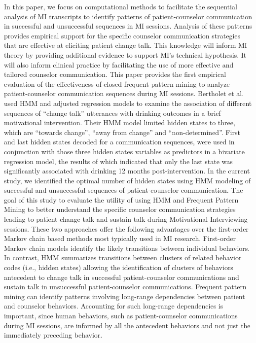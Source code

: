 In this paper, we focus on computational methods to facilitate the sequential analysis of MI transcripts to identify patterns of patient-counselor communication in successful and unsuccessful sequences in MI sessions. Analysis of these patterns provides empirical support for the specific counselor communication strategies that are effective at eliciting patient change talk. This knowledge will inform MI theory by providing additional evidence to support MI's technical hypothesis. It will also inform clinical practice by facilitating the use of more effective and tailored counselor communication. This paper provides the first empirical evaluation of the effectiveness of closed frequent pattern mining to analyze patient-counselor communication sequences during MI sessions. Bertholet et al.~\cite{bertholet2010change} used HMM and adjusted regression models to examine the association of different sequences of ``change talk'' utterances with drinking outcomes in a brief motivational intervention. Their HMM model limited hidden states to three, which are ``towards change'', ``away from change'' and ``non-determined''. First and last hidden states decoded for a communication sequences, were used in conjunction with those three hidden states variables as predictors in a bivariate regression model, the results of which indicated that only the last state was significantly associated with drinking 12 months post-intervention. In the current study, we identified the optimal number of hidden states using HMM modeling of successful and unsuccessful sequences of patient-counselor communication. The goal of this study to evaluate the utility of using HMM and Frequent Pattern Mining to better understand the specific counselor communication strategies leading to patient change talk and sustain talk during Motivational Interviewing sessions. These two approaches offer the following advantages over the first-order Markov chain based methods most typically used in MI research. First-order Markov chain models identify the likely transitions between individual behaviors. In contrast, HMM summarizes transitions between clusters of related behavior codes (i.e., hidden states) allowing the identification of clusters of behaviors antecedent to change talk in successful patient-counselor communications and sustain talk in unsuccessful patient-counselor communications. Frequent pattern mining can identify patterns involving long-range dependencies between patient and counselor behaviors. Accounting for such long-range dependencies is important, since human behaviors, such as patient-counselor communications during MI sessions, are informed by all the antecedent behaviors and not just the immediately preceding behavior.

